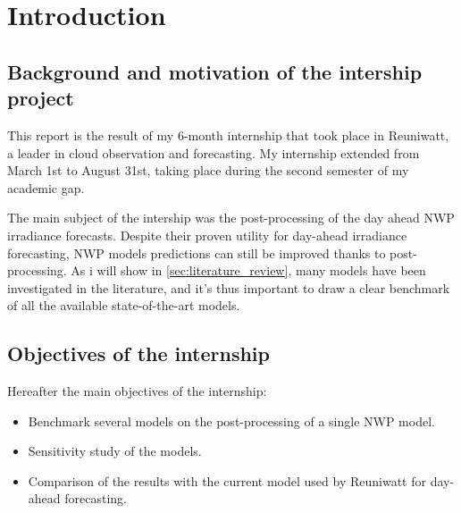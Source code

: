 \section{Introduction}
\subsection{Background and motivation of the intership project}
This report is the result of my 6-month internship that took place in Reuniwatt, a leader in cloud observation and forecasting.
My internship extended from March 1st to August 31st, taking place during the second semester of my academic gap.

The main subject of the intership was the post-processing of the day ahead NWP irradiance forecasts.
Despite their proven utility for day-ahead irradiance forecasting, NWP models predictions can still be improved thanks to post-processing.
As i will show in \ref{sec:literature_review}, many models have been investigated in the literature, and it's thus important to draw a clear benchmark
of all the available state-of-the-art models.
\subsection{Objectives of the internship}
Hereafter the main objectives of the internship:
\begin{itemize}
    \item  Benchmark several models on the post-processing of a single NWP model.
    \item Sensitivity study of the models.
    \item Comparison of the results with the current model used by Reuniwatt for day-ahead forecasting.
\end{itemize}